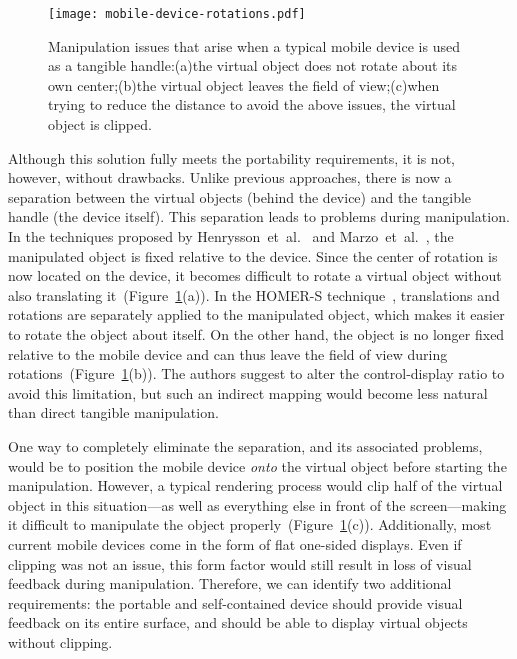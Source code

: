 \documentclass{vgtc}                         \havecopyrightspacefalse
\begin{document}
\begin{figure}[t]
  \centering
  \texttt{[image: mobile-device-rotations.pdf]}
  \caption{Manipulation issues that arise when a typical mobile device is used as a tangible handle:\enskip (a)\;the virtual object does not rotate about its own center;\enskip (b)\;the virtual object leaves the field of view;\enskip (c)\;when trying to reduce the distance to avoid the above issues, the virtual object is clipped.}
  \label{fig:mobile-device-issues}
\end{figure}

Although this solution fully meets the portability requirements, it is not, however, without drawbacks. Unlike previous approaches, there is now a separation between the virtual objects (behind the device) and the tangible handle (the device itself). This separation leads to problems during manipulation. In the techniques proposed by Henrysson~et~al.~\cite{henrysson05} and Marzo~et~al.~\cite{marzo14}, the manipulated object is fixed relative to the device. Since the center of rotation is now located on the device, it becomes difficult to rotate a virtual object without also translating it~(Figure~\ref{fig:mobile-device-issues}(a)). In the HOMER-S technique~\cite{mossel13}, translations and rotations are separately applied to the manipulated object, which makes it easier to rotate the object about itself. On the other hand, the object is no longer fixed relative to the mobile device and can thus leave the field of view during rotations~(Figure~\ref{fig:mobile-device-issues}(b)). The authors suggest to alter the control-display ratio to avoid this limitation, but such an indirect mapping would become less natural than direct tangible manipulation.

One way to completely eliminate the separation, and its associated problems, would be to position the mobile device \emph{onto} the virtual object before starting the manipulation. However, a typical rendering process would clip half of the virtual object in this situation---as well as everything else in front of the screen---making it difficult to manipulate the object properly~(Figure~\ref{fig:mobile-device-issues}(c)). Additionally, most current mobile devices come in the form of flat one-sided displays. Even if clipping was not an issue, this form factor would still result in loss of visual feedback during manipulation. Therefore, we can identify two additional requirements: the portable and self-contained device should provide visual feedback on its entire surface, and should be able to display virtual objects without clipping.
\end{document}
